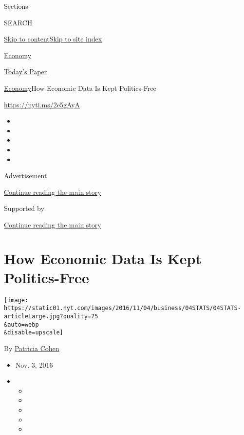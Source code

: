 Sections

SEARCH

\protect\hyperlink{site-content}{Skip to
content}\protect\hyperlink{site-index}{Skip to site index}

\href{https://www.nytimes.com/section/business/economy}{Economy}

\href{https://myaccount.nytimes.com/auth/login?response_type=cookie\&client_id=vi}{}

\href{https://www.nytimes.com/section/todayspaper}{Today's Paper}

\href{/section/business/economy}{Economy}\textbar{}How Economic Data Is
Kept Politics-Free

\url{https://nyti.ms/2e5gAyA}

\begin{itemize}
\item
\item
\item
\item
\item
\end{itemize}

Advertisement

\protect\hyperlink{after-top}{Continue reading the main story}

Supported by

\protect\hyperlink{after-sponsor}{Continue reading the main story}

\hypertarget{how-economic-data-is-kept-politics-free}{%
\section{How Economic Data Is Kept
Politics-Free}\label{how-economic-data-is-kept-politics-free}}

\texttt{[image: https://static01.nyt.com/images/2016/11/04/business/04STATS/04STATS-articleLarge.jpg?quality=75\\\&auto=webp\\\&disable=upscale]}

By \href{http://www.nytimes.com/by/patricia-cohen}{Patricia Cohen}

\begin{itemize}
\item
  Nov. 3, 2016
\item
  \begin{itemize}
  \item
  \item
  \item
  \item
  \item
  \end{itemize}
\end{itemize}

